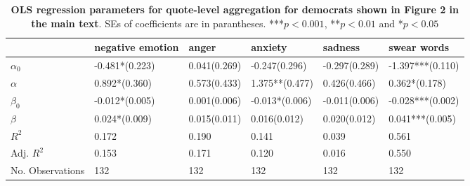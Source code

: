 \begin{table}[h]\centering
\caption{\textbf{OLS regression parameters for quote-level aggregation for democrats shown in Figure 2 in the main text}. SEs of coefficients are in parantheses. ***$p < 0.001$, **$p < 0.01$ and *$p < 0.05$}
	\label{fig: Party_5}
\begin{adjustbox}{width=\linewidth, center}
	\begin{tabular}{llllll}
	\toprule
	{} &                                negative emotion &                                                     anger &                                                   anxiety &                                                   sadness &                                     swear words \\
	\midrule
	$\alpha_0$       &            -0.481*\phantom{*}\phantom{*}(0.223) &  \phantom{-}0.041\phantom{*}\phantom{*}\phantom{*}(0.269) &            -0.247\phantom{*}\phantom{*}\phantom{*}(0.296) &            -0.297\phantom{*}\phantom{*}\phantom{*}(0.289) &                                -1.397***(0.110) \\
	$\alpha$         &  \phantom{-}0.892*\phantom{*}\phantom{*}(0.360) &  \phantom{-}0.573\phantom{*}\phantom{*}\phantom{*}(0.433) &                      \phantom{-}1.375**\phantom{*}(0.477) &  \phantom{-}0.426\phantom{*}\phantom{*}\phantom{*}(0.466) &  \phantom{-}0.362*\phantom{*}\phantom{*}(0.178) \\
	$\beta_0$        &            -0.012*\phantom{*}\phantom{*}(0.005) &  \phantom{-}0.001\phantom{*}\phantom{*}\phantom{*}(0.006) &                      -0.013*\phantom{*}\phantom{*}(0.006) &            -0.011\phantom{*}\phantom{*}\phantom{*}(0.006) &                                -0.028***(0.002) \\
	$\beta$          &  \phantom{-}0.024*\phantom{*}\phantom{*}(0.009) &  \phantom{-}0.015\phantom{*}\phantom{*}\phantom{*}(0.011) &  \phantom{-}0.016\phantom{*}\phantom{*}\phantom{*}(0.012) &  \phantom{-}0.020\phantom{*}\phantom{*}\phantom{*}(0.012) &                      \phantom{-}0.041***(0.005) \\
	$R^2$            &                                           0.172 &                                                     0.190 &                                                     0.141 &                                                     0.039 &                                           0.561 \\
	Adj. $R^2$       &                                           0.153 &                                                     0.171 &                                                     0.120 &                                                     0.016 &                                           0.550 \\
	No. Observations &                                             132 &                                                       132 &                                                       132 &                                                       132 &                                             132 \\
	\bottomrule
	\end{tabular}
	

\end{adjustbox}
\end{table}

